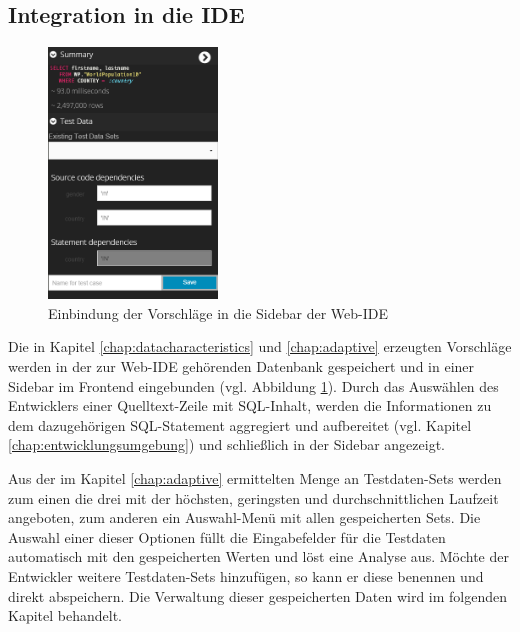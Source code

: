 \subsection{Integration in die IDE}
\begin{figure}[ht]
	\centering
  \includegraphics[width=0.4\textwidth]{figures/integration.png}
	\caption{Einbindung der Vorschläge in die Sidebar der Web-IDE}
	\label{fig:ideintegration}
\end{figure}

Die in Kapitel \ref{chap:datacharacteristics} und \ref{chap:adaptive} erzeugten Vorschläge werden in der zur Web-IDE gehörenden Datenbank gespeichert und in einer Sidebar im Frontend eingebunden (vgl. Abbildung \ref{fig:ideintegration}).
Durch das Auswählen des Entwicklers einer Quelltext-Zeile mit SQL-Inhalt, werden die Informationen zu dem dazugehörigen SQL-Statement aggregiert und aufbereitet (vgl. Kapitel \ref{chap:entwicklungsumgebung}) und schließlich in der Sidebar angezeigt.

Aus der im Kapitel \ref{chap:adaptive} ermittelten Menge an Testdaten-Sets werden zum einen die drei mit der höchsten, geringsten und durchschnittlichen Laufzeit angeboten, zum anderen ein Auswahl-Menü mit allen gespeicherten Sets.
Die Auswahl einer dieser Optionen füllt die Eingabefelder für die Testdaten automatisch mit den gespeicherten Werten und löst eine Analyse aus.
Möchte der Entwickler weitere Testdaten-Sets hinzufügen, so kann er diese benennen und direkt abspeichern.
Die Verwaltung dieser gespeicherten Daten wird im folgenden Kapitel behandelt.
